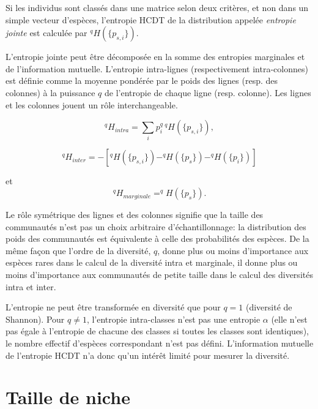 \documentclass[
  11pt,
  french,
  a4paper,
  extrafontsizes,onecolumn,openright
  ]{memoir}
\begin{document}
Si les individus sont classés dans une matrice selon deux critères, et non dans un simple vecteur d'espèces, l'entropie HCDT de la distribution appelée \emph{entropie jointe} est calculée par \(^{q}\!H(\{p_{s,i}\})\).

L'entropie jointe peut être décomposée en la somme des entropies marginales et de l'information mutuelle.
L'entropie intra-lignes (respectivement intra-colonnes) est définie comme la moyenne pondérée par le poids des lignes (resp. des colonnes) à la puissance \(q\) de l'entropie de chaque ligne (resp. colonne).
Les lignes et les colonnes jouent un rôle interchangeable.

\begin{equation}
  \label{eq:Hqintra}
  ^q\!H_{\mathit{intra}}
  = \sum_i{p^q_{i}\,{^{q}\!H(\{p_{s,i}\})}},
\end{equation}

\begin{equation}
  \label{eq:Hqinter}
  ^q\!H_{\mathit{inter}}
  =-\left[^{q}\!H\left(\{p_{s,i}\}\right) - ^{q}\!H\left(\{p_{s}\}\right) - ^{q}\!H\left(\{p_{i}\}\right)\right]
\end{equation}

et
\begin{equation}
  \label{eq:Hqmarginale}
  ^q\!H_{\mathit{marginale}} = ^{q}\!H\left(\{p_{s}\}\right).
\end{equation}

Le rôle symétrique des lignes et des colonnes signifie que la taille des communautés n'est pas un choix arbitraire d'échantillonnage: la distribution des poids des communautés est équivalente à celle des probabilités des espèces.
De la même façon que l'ordre de la diversité, \(q\), donne plus ou moins d'importance aux espèces rares dans le calcul de la diversité intra et marginale, il donne plus ou moins d'importance aux communautés de petite taille dans le calcul des diversités intra et inter.

L'entropie ne peut être transformée en diversité que pour \(q=1\) (diversité de Shannon).
Pour \(q \ne 1\), l'entropie intra-classes n'est pas une entropie \(\alpha\) (elle n'est pas égale à l'entropie de chacune des classes si toutes les classes sont identiques), le nombre effectif d'espèces correspondant n'est pas défini.
L'information mutuelle de l'entropie HCDT n'a donc qu'un intérêt limité pour mesurer la diversité.

\hypertarget{taille-de-niche}{%
\section{Taille de niche}\label{taille-de-niche}}
\end{document}
